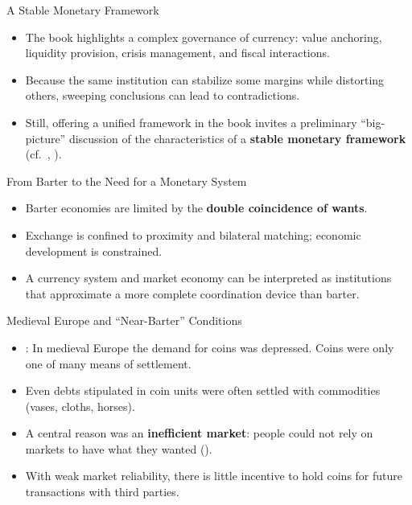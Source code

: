\documentclass[11pt,aspectratio=169]{beamer}
\begin{document}
\begin{frame}{A Stable Monetary Framework}
\small
\begin{itemize}
  \item The book highlights a complex governance of currency: value anchoring, liquidity provision, crisis management, and fiscal interactions.
  \item Because the same institution can stabilize some margins while distorting others, sweeping conclusions can lead to contradictions.
  \item Still, offering a unified framework in the book invites a preliminary \enquote{big-picture} discussion of the characteristics of a \textbf{stable monetary framework} (cf.\ \cite{friedman1960program}, \cite{friedmanschwartz1986}).
\end{itemize}
\end{frame}

\begin{frame}{From Barter to the Need for a Monetary System}
\small
\begin{itemize}
  \item Barter economies are limited by the \textbf{double coincidence of wants}.
  \vspace{1em}
  \item Exchange is confined to proximity and bilateral matching; economic development is constrained.
    \vspace{1em}
  \item A currency system and market economy can be interpreted as institutions that approximate a more complete coordination device than barter.
\end{itemize}
\end{frame}

\begin{frame}{Medieval Europe and ``Near-Barter'' Conditions}
\small
\begin{itemize}
  \item \textcite{cipolla1956}: In medieval Europe the demand for coins was depressed. Coins were only one of many means of settlement.
  \item Even debts stipulated in coin units were often settled with commodities (vases, cloths, horses).
  \item A central reason was an \textbf{inefficient market}:
  people could not rely on markets to have what they wanted (\cite{cipolla1956}).
  \item With weak market reliability, there is little incentive to hold coins for future transactions with third parties.
\end{itemize}
\end{frame}
\end{document}
